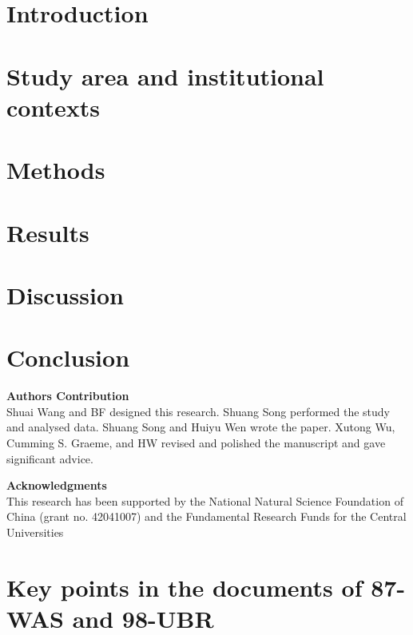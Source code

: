 \documentclass[preprint, 12pt]{elsarticle}
\begin{document}
\section{Introduction}\label{sec:introduction}


\section{Study area and institutional contexts}\label{sec:yrb}


\section{Methods}\label{sec:methods}


\section{Results}\label{sec:results}



\section{Discussion}\label{sec:discussion}


\section{Conclusion}\label{sec:conclusion}


\textbf{Authors Contribution}\\
Shuai Wang and BF designed this research. Shuang Song performed the study and analysed data. Shuang Song and Huiyu Wen wrote the paper. Xutong Wu, Cumming S. Graeme, and HW revised and polished the manuscript and gave significant advice.

\textbf{Acknowledgments}\\
This research has been supported by the National Natural Science Foundation of China (grant no. 42041007) and the Fundamental Research Funds for the Central Universities


\label{bib}

\newpage
\appendix\label{appendix}

\section{Key points in the documents of 87-WAS and 98-UBR}\label{secS1}
\renewcommand{\thefigure}{A\arabic{figure}}
\renewcommand{\thetable}{A\arabic{table}}
\setcounter{figure}{0}
\setcounter{table}{0}

\end{document}
